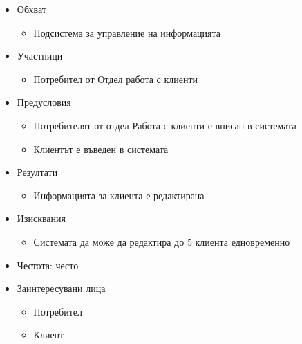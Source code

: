 \begin{frame}
\begin{itemize}

\item{} 	Обхват
 \begin{itemize}

\item{}Подсистема за управление на информацията
\end{itemize}


\item{} 	Участници
 \begin{itemize}

\item{}Потребител от Отдел работа с клиенти
\end{itemize}


\item{} 	Предусловия
 \begin{itemize}

\item{}Потребителят от отдел Работа с клиенти е вписан в системата

\item{}Клиентът е въведен в системата
\end{itemize}


\item{} 	Резултати
 \begin{itemize}

\item{}Информацията за клиента е редактирана
\end{itemize}


\item{} 	Изисквания
 \begin{itemize}

\item{}Системата да може да редактира до 5 клиента едновременно
\end{itemize}


\item{} 	Честота: често
 

\item{} 	Заинтересувани лица
 \begin{itemize}

\item{}Потребител

\item{}Клиент
\end{itemize}

\end{itemize}
\end{frame}


